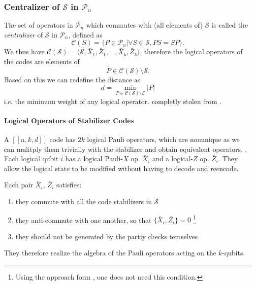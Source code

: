 \subsubsection{Centralizer of $\mathcal{S}$ in $\mathcal{P}_n$}
The set of operators in $\mathcal{P}_n$ which commutes with (all elements of) $\mathcal{S}$ is called the \textit{centralizer} of $\mathcal{S}$ in $\mathcal{P}_n$, defined as 
\begin{equation}
    \mathcal{C}(S) = \{ P \in \mathcal{P}_n | \forall S \in \mathcal{S}, PS = SP\}.
\end{equation}
We thus have $\mathcal{C}(\mathcal{S}) = \langle \mathcal{S}, \bar{X}_1, \bar{Z}_1, ..., \bar{X}_k, \bar{Z}_k\rangle$, 
therefore the logical operators of the codes are elements of 
\begin{equation}
    \bar{P} \in \mathcal{C}(\mathcal{S})\setminus \mathcal{S}.
\end{equation}
Based on this we can redefine the distance as
\begin{equation}
    d = \min_{P \in \mathcal{C}(\mathcal{S})\setminus\mathcal{S}} |P|
\end{equation}
i.e. the minimum weight of any logical operator.
completly stolen from \cite{QECmemory}.

\paragraph{Logical Operators of Stabilizer Codes}
A $[[n,k,d]]$ code has $2k$ logical Pauli operators, which are nonunique as we can mulitply them trivially with the stabilizer and obtain equivalent operators. \cite{QECintro},\cite{QECmemory} 
Each logical qubit $i$ has a logical Pauli-$X$ op. $\bar{X}_i$ and a logical-$Z$ op. $\bar{Z}_i$. 
They allow the logical state to be modified without having to decode and reencode. \cite{QECintro}

Each pair $\bar{X}_i$, $\bar{Z}_i$ satisfies:
\begin{enumerate}
    \item they commute with all the code stabilizers in $\mathcal{S}$ 
    \item they anti-commute with one another, so that $\{ \bar{X}_i, \bar{Z_i}\}=0$ \footnote{Using the approach form \cite{QECmemory}, one does not need this condition.}
    \item they should not be generated by the partiy checks temselves \cite{QECmemory}
\end{enumerate}
They therefore realize the algebra of the Pauli operators acting on the $k$-qubits. \cite{QECmemory}







